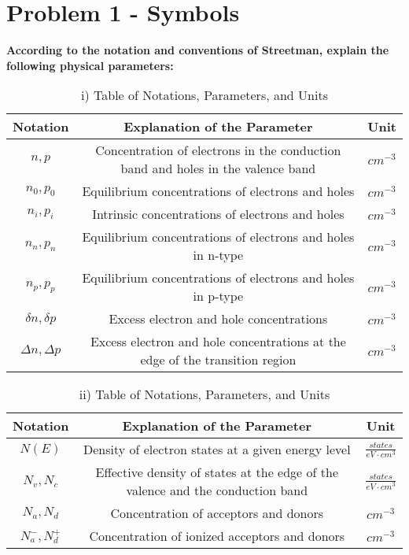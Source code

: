 \section{Problem 1 - Symbols}
\textbf{According to the notation and conventions of Streetman, explain the following physical parameters:}

\begin{table}[H]
    \centering
    \caption{i) Table of Notations, Parameters, and Units}
    \begin{tabular}{ccc}
        \hline
        \textbf{Notation} & \textbf{Explanation of the Parameter} & \textbf{Unit} \\
        \hline
        $n, p$ & Concentration of electrons in the conduction band and holes in the valence band & $cm^{-3}$ \\
        $n_0, p_0$ & Equilibrium concentrations of electrons and holes & $cm^{-3}$ \\
        $n_i, p_i$ & Intrinsic concentrations of electrons and holes & $cm^{-3}$ \\
        $n_n, p_n$ & Equilibrium concentrations of electrons and holes in n-type & $cm^{-3}$ \\
        $n_p, p_p$ & Equilibrium concentrations of electrons and holes in p-type & $cm^{-3}$ \\
        $\delta n, \delta p$ & Excess electron and hole concentrations & $cm^{-3}$ \\
        $\Delta n, \Delta p$ & Excess electron and hole concentrations at the edge of the transition region & $cm^{-3}$ \\
    \end{tabular}
    \label{tab:notations}
\end{table}


\begin{table}[H]
    \centering
    \caption{ii) Table of Notations, Parameters, and Units}
    \begin{tabular}{ccc}
        \hline
        \textbf{Notation} & \textbf{Explanation of the Parameter} & \textbf{Unit} \\
        \hline
        $N(E)$ & Density of electron states at a given energy level & $\frac{states}{eV\cdot cm^3}$ \\
        $N_v, N_c$ & Effective density of states at the edge of the valence and the conduction band & $\frac{states}{eV\cdot cm^3}$ \\
        $N_a, N_d$ & Concentration of acceptors and donors & $cm^{-3}$ \\
        $N_a^-, N_d^+$ & Concentration of ionized acceptors and donors & $cm^{-3}$ \\
    \end{tabular}
    \label{tab:notations2}
\end{table}


